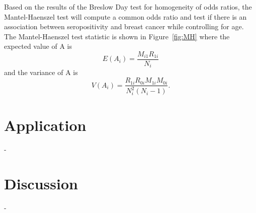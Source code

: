 \documentclass[12pt, titlepage]{article}
\begin{document}
Based on the results of the Breslow Day test for homogeneity of odds ratios,
the Mantel-Haenszel test will compute a common odds ratio and test if there 
is an association between seropositivity and breast cancer while controlling 
for age. The Mantel-Haenszel test statistic is shown in Figure~\ref{fig:MH}
where the expected value of A is 
\begin{equation}
  E(A_{i})=\frac{M_{i1}R_{1i}}{N_{i}} 
\end{equation}
and the variance of A is 
\begin{equation}
  V(A_{i})=\frac{R_{1i}R_{0i}M_{1i}M_{0i}}{N_i^2(N_{i}-1)}. 
\end{equation}


\section{Application}
\label{sec:app}
-

\section{Discussion}
\label{sec:discuss}

-




\end{document}
